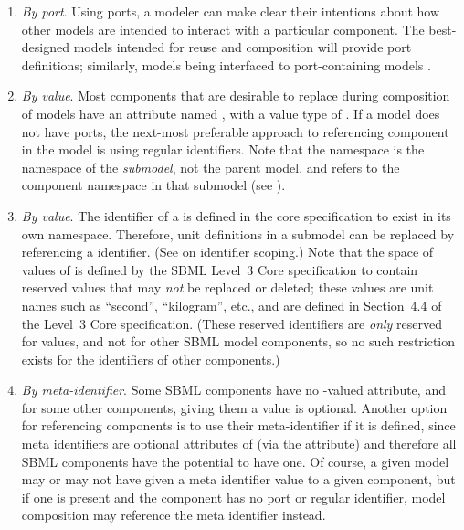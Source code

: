 \begin{enumerate}

\item \emph{By port}.  Using ports, a modeler can make clear their intentions about how other models are intended to interact with a particular component.  The best-designed models intended for reuse and composition will provide port definitions; similarly, models being interfaced to port-containing models .

\item \emph{By \fixttspace{} value}.  Most components that are desirable to replace during composition of models have an attribute named , with a value type of .  If a model does not have ports, the next-most preferable approach to referencing component in the model is using regular identifiers.  Note that the  namespace is the namespace of the \emph{submodel}, not the parent model, and refers to the component namespace in that submodel (see ).

\item \emph{By \fixttspace{} value}.  The identifier of a \UnitDefinition is defined in the core specification to exist in its own namespace.  Therefore, unit definitions in a submodel can be replaced by referencing a \UnitDefinition identifier.  (See  on identifier scoping.)  Note that the space of values of  is defined by the SBML Level~3 Core specification to contain reserved values that may \emph{not} be replaced or deleted; these values are unit names such as ``second'', ``kilogram'', etc., and are defined in Section~4.4 of the Level~3 Core specification.  (These reserved identifiers are \emph{only} reserved for \UnitDefinition values, and not for other SBML model components, so no such restriction exists for the identifiers of other components.)

\item \emph{By meta-identifier}.  Some SBML components have no -valued attribute, and for some other components, giving them a value is optional.  Another option for referencing components is to use their meta-identifier if it is defined, since meta identifiers are optional attributes of \SBase (via the  attribute) and therefore all SBML components have the potential to have one.  Of course, a given model may or may not have given a meta identifier value to a given component, but if one is present and the component has no port or regular identifier, model composition may reference the meta identifier instead.


\end{enumerate}
